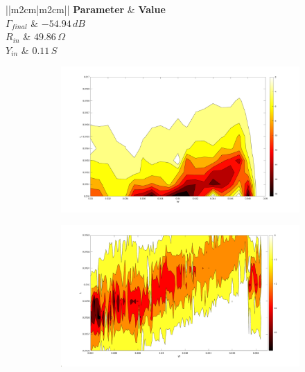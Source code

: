 \documentclass[12pt,a4paper]{article}
\begin{document}
{\begin{table}
	\begin{center}
	{\selectfont	\begin{tabular}{||m{2cm}|m{2cm}||}
\hline
\textbf{Parameter} & \textbf{Value}\\
\hline
	$\Gamma_{final}$ & $-54.94\,dB$\\
	\hline
	 $R_{in}$ & $49.86\,\Omega$ \\
	 \hline
	 $Y_{in}$ & $ 0.11\,S$ \\
\hline
		\end{tabular}}
	\caption{Final $\Gamma$ and impedance matching values after $w_{feed}$ change}
	\label{table:Gamma and Z}
	\end{center}
\end{table}
\begin{figure}[h]
	\begin{center}
		\begin{subfigure}{0.5\linewidth}
			\includegraphics[scale=0.25]{First_Contour_LOG.pdf}
			\caption{}
			\label{fig:first contour}
		\end{subfigure}
		\begin{subfigure}{0.5\linewidth}
			\includegraphics[scale=0.25]{Second_Contour_LOG.pdf}

\end{subfigure}
\end{center}
\end{figure}}
\end{document}
